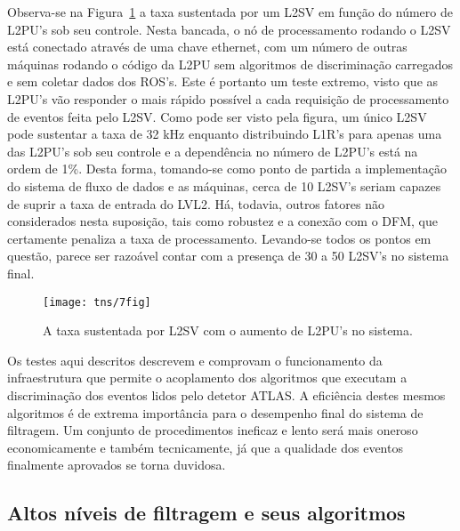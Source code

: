 Observa-se na Figura~\ref{fig:tns-7fig} a taxa sustentada por um L2SV em
função do número de L2PU's sob seu controle. Nesta bancada, o nó de
processamento rodando o L2SV está conectado através de uma chave 
ethernet, com um número de outras máquinas rodando o código da L2PU sem
algoritmos de discriminação carregados e sem coletar dados dos ROS's. Este é
portanto um teste extremo, visto que as L2PU's vão responder o mais rápido
possível a cada requisição de processamento de eventos feita pelo L2SV. Como
pode ser visto pela figura, um único L2SV pode sustentar a taxa de 32 kHz
enquanto distribuindo L1R's para apenas uma das L2PU's sob seu controle e a
dependência no número de L2PU's está na ordem de 1\%. Desta forma, tomando-se
como ponto de partida a implementação do sistema de fluxo de dados e as
máquinas, cerca de 10 L2SV's seriam capazes de suprir a taxa de entrada do
LVL2. Há, todavia, outros fatores não considerados nesta suposição, tais como
robustez e a conexão com o DFM, que certamente penaliza a taxa de
processamento. Levando-se todos os pontos em questão, parece ser razoável
contar com a presença de 30 a 50 L2SV's no sistema final.

\begin{figure}
\begin{center}
\texttt{[image: tns/7fig]}
\end{center}
\caption{A taxa sustentada por L2SV com o aumento de L2PU's no sistema.}
\label{fig:tns-7fig}
\end{figure}

Os testes aqui descritos descrevem e comprovam o funcionamento da
infraestrutura que permite o acoplamento dos algoritmos que executam a
discriminação dos eventos lidos pelo detetor ATLAS. A eficiência destes mesmos
algoritmos é de extrema importância para o desempenho final do sistema de
filtragem. Um conjunto de procedimentos ineficaz e lento será mais oneroso
economicamente e também tecnicamente, já que a qualidade dos eventos
finalmente aprovados se torna duvidosa.

\subsection{Altos níveis de filtragem e seus algoritmos}
\label{sec:hlt}


